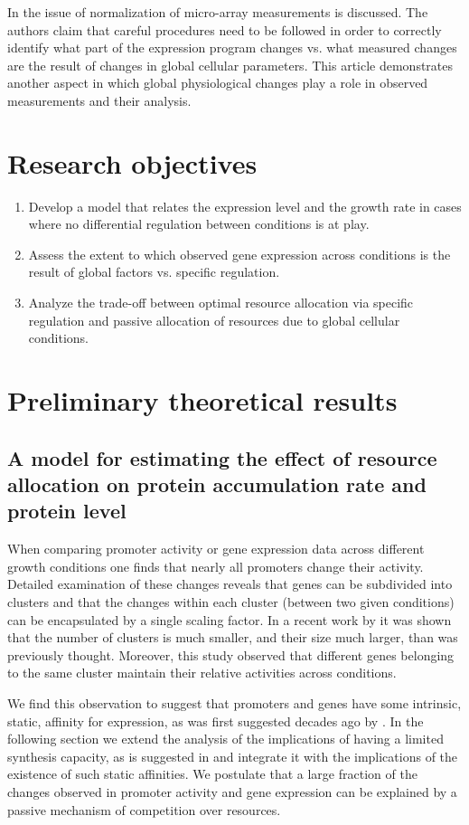 \documentclass[a4page,notitlepage]{article}
\begin{document}
In \parencite{loven2012} the issue of normalization of micro-array measurements is discussed.
The authors claim that careful procedures need to be followed in order to correctly identify what part of the expression program changes vs. what measured changes are the result of changes in global cellular parameters.
This article demonstrates another aspect in which global physiological changes play a role in observed measurements and their analysis.

\section{Research objectives}
\begin{enumerate}
\item Develop a model that relates the expression level and the growth rate in cases where no differential regulation between conditions is at play.
\item Assess the extent to which observed gene expression across conditions is the result of global factors vs. specific regulation.
\item Analyze the trade-off between optimal resource allocation via specific regulation and passive allocation of resources due to global cellular conditions.
\end{enumerate}
\section{Preliminary theoretical results}
\subsection{A model for estimating the effect of resource allocation on protein accumulation rate and protein level}
When comparing promoter activity or gene expression data across different growth conditions one finds that nearly all promoters change their activity.
Detailed examination of these changes reveals that genes can be subdivided into clusters and that the changes within each cluster (between two given conditions) can be encapsulated by a single scaling factor.
In a recent work by \parencite{Leeat2013} it was shown that the number of clusters is much smaller, and their size much larger, than was previously thought.
Moreover, this study observed that different genes belonging to the same cluster maintain their relative activities across conditions.

We find this observation to suggest that promoters and genes have some intrinsic, static, affinity for expression, as was first suggested decades ago by \parencite{Maaloe1969}.
In the following section we extend the analysis of the implications of having a limited synthesis capacity, as is suggested in \parencite{Leeat2013} and integrate it with the implications of the existence of such static affinities.
We postulate that a large fraction of the changes observed in promoter activity and gene expression can be explained by a passive mechanism of competition over resources.
\end{document}
